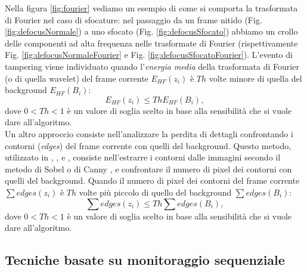 Nella figura \ref{fig:fourier} vediamo un esempio di come si comporta la trasformata di Fourier nel caso di sfocature: 
nel passaggio da un frame nitido (Fig. \ref{fig:defocusNormale}) a uno sfocato (Fig. \ref{fig:defocusSfocato}) abbiamo un crollo delle componenti ad alta frequenza nelle trasformate di Fourier (rispettivamente Fig. \ref{fig:defocusNormaleFourier} e Fig. \ref{fig:defocusSfocatoFourier}).
L'evento di tampering viene individuato quando l'\textit{energia media} della trasformata di Fourier (o di quella wavelet) del frame corrente $E_{HF}(z_i)$ \`e $Th$ volte minore di quella del background $E_{HF}(B_i)$:
\[E_{HF}(z_i)\leq Th E_{HF}(B_i),\]
dove $0<Th<1$ \`e  un valore di soglia scelto in base alla sensibilit\`a che si vuole dare all'algoritmo.\\
Un altro approccio consiste nell'analizzare la perdita di dettagli confrontando i contorni (\textit{edges}) del frame corrente con quelli del background.
Questo metodo, utilizzato in \cite{ellwart2012camera}, \cite{gil2007automatic}, \cite{harasse2004automated} e \cite{kryjak2012fpga}, consiste nell'estrarre i contorni dalle immagini secondo il metodo di Sobel \cite{sobel19683x3} o di Canny \cite{canny1986computational}, e confrontare il numero di pixel dei contorni con quelli del background. 
Quando il numero di pixel dei contorni del frame corrente $\sum edges(z_i)$ \`e $Th$ volte pi\`u piccolo di quello del background $\sum edges(B_i)$:
\[ \sum edges(z_i) \leq Th \sum edges(B_i), \]
dove $0<Th<1$ \`e  un valore di soglia scelto in base alla sensibilit\`a che si vuole dare all'algoritmo.
\subsection{Tecniche basate su monitoraggio sequenziale}